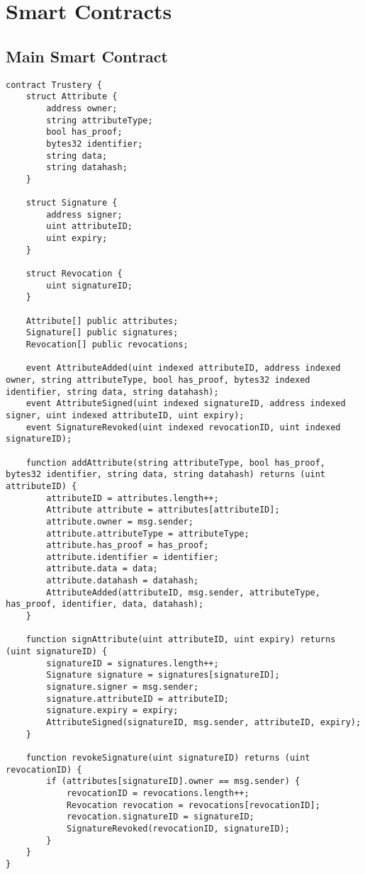 \documentclass[12pt]{report}
\begin{document}
	
	
	
	\appendix
	\chapter{Smart Contracts}
	\section{Main Smart Contract}
	\begin{lstlisting}
contract Trustery {
    struct Attribute {
        address owner;
        string attributeType;
        bool has_proof;
        bytes32 identifier;
        string data;
        string datahash;
    }

    struct Signature {
        address signer;
        uint attributeID;
        uint expiry;
    }

    struct Revocation {
        uint signatureID;
    }

    Attribute[] public attributes;
    Signature[] public signatures;
    Revocation[] public revocations;

    event AttributeAdded(uint indexed attributeID, address indexed owner, string attributeType, bool has_proof, bytes32 indexed identifier, string data, string datahash);
    event AttributeSigned(uint indexed signatureID, address indexed signer, uint indexed attributeID, uint expiry);
    event SignatureRevoked(uint indexed revocationID, uint indexed signatureID);

    function addAttribute(string attributeType, bool has_proof, bytes32 identifier, string data, string datahash) returns (uint attributeID) {
        attributeID = attributes.length++;
        Attribute attribute = attributes[attributeID];
        attribute.owner = msg.sender;
        attribute.attributeType = attributeType;
        attribute.has_proof = has_proof;
        attribute.identifier = identifier;
        attribute.data = data;
        attribute.datahash = datahash;
        AttributeAdded(attributeID, msg.sender, attributeType, has_proof, identifier, data, datahash);
    }

    function signAttribute(uint attributeID, uint expiry) returns (uint signatureID) {
        signatureID = signatures.length++;
        Signature signature = signatures[signatureID];
        signature.signer = msg.sender;
        signature.attributeID = attributeID;
        signature.expiry = expiry;
        AttributeSigned(signatureID, msg.sender, attributeID, expiry);
    }

    function revokeSignature(uint signatureID) returns (uint revocationID) {
        if (attributes[signatureID].owner == msg.sender) {
            revocationID = revocations.length++;
            Revocation revocation = revocations[revocationID];
            revocation.signatureID = signatureID;
            SignatureRevoked(revocationID, signatureID);
        }
    }
}
	\end{lstlisting}
\end{document}
